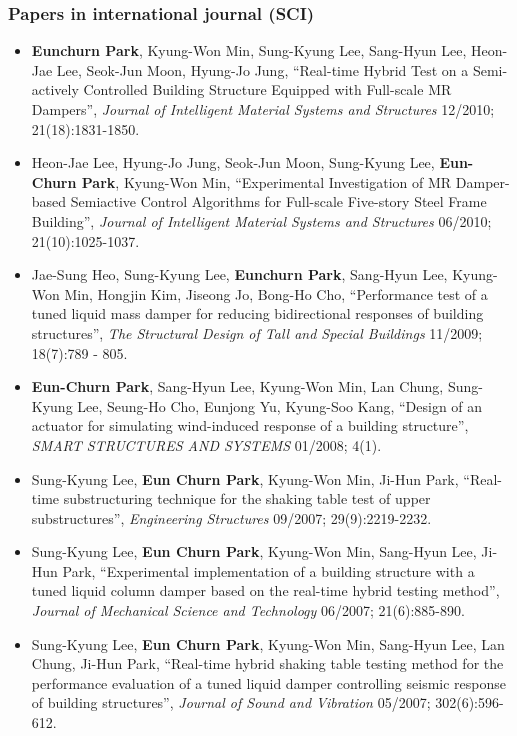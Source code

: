 \subsubsection*{Papers in international journal (SCI)}
\begin{itemize}
\item
  \textbf{Eunchurn Park}, Kyung-Won Min, Sung-Kyung Lee, Sang-Hyun Lee, Heon-Jae Lee, Seok-Jun Moon, Hyung-Jo Jung, ``Real-time Hybrid Test on a Semi-actively Controlled Building Structure Equipped with Full-scale MR Dampers'', \emph{Journal of Intelligent Material Systems and Structures} 12/2010; 21(18):1831-1850.
\item
  Heon-Jae Lee, Hyung-Jo Jung, Seok-Jun Moon, Sung-Kyung Lee, \textbf{Eun-Churn Park}, Kyung-Won Min, ``Experimental Investigation of MR Damper-based Semiactive Control Algorithms for Full-scale Five-story Steel Frame Building'', \emph{Journal of Intelligent Material Systems and Structures} 06/2010; 21(10):1025-1037. 
\item
  Jae-Sung Heo, Sung-Kyung Lee, \textbf{Eunchurn Park}, Sang-Hyun Lee, Kyung-Won Min, Hongjin Kim, Jiseong Jo, Bong-Ho Cho, ``Performance test of a tuned liquid mass damper for reducing bidirectional responses of building structures'', \emph{The Structural Design of Tall and Special Buildings} 11/2009; 18(7):789 - 805.
\item
  \textbf{Eun-Churn Park}, Sang-Hyun Lee, Kyung-Won Min, Lan Chung, Sung-Kyung Lee, Seung-Ho Cho, Eunjong Yu, Kyung-Soo Kang, ``Design of an actuator for simulating wind-induced response of a building structure'', \emph{SMART STRUCTURES AND SYSTEMS} 01/2008; 4(1).
\item
  Sung-Kyung Lee, \textbf{Eun Churn Park}, Kyung-Won Min, Ji-Hun Park, ``Real-time substructuring technique for the shaking table test of upper substructures'', \emph{Engineering Structures} 09/2007; 29(9):2219-2232.
\item
  Sung-Kyung Lee, \textbf{Eun Churn Park}, Kyung-Won Min, Sang-Hyun Lee, Ji-Hun Park, ``Experimental implementation of a building structure with a tuned liquid column damper based on the real-time hybrid testing method'', \emph{Journal of Mechanical Science and Technology} 06/2007; 21(6):885-890.
\item
  Sung-Kyung Lee, \textbf{Eun Churn Park}, Kyung-Won Min, Sang-Hyun Lee, Lan Chung, Ji-Hun Park, ``Real-time hybrid shaking table testing method for the performance evaluation of a tuned liquid damper controlling seismic response of building structures'', \emph{Journal of Sound and Vibration} 05/2007; 302(6):596-612.
\end{itemize}
